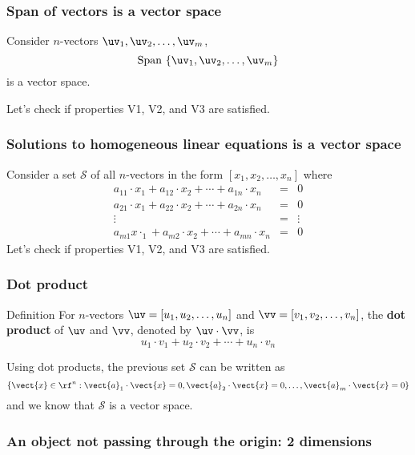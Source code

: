 \begin{frame}
  \frametitle{Span of vectors is a vector space}
  Consider $n$-vectors $\uv_1,\uv_2,\ldots,\uv_m$,
  \[
  \mathrm{Span}\ \{\uv_1,\uv_2,\ldots,\uv_m\}
  \]
  is a vector space.

  \pause
  \vspace{0.2in}
  Let's check if properties V1, V2, and V3 are satisfied.
  \vspace{1.5in}
\end{frame}

\begin{frame}
  \frametitle{Solutions to homogeneous linear equations is a vector space}
  Consider a set ${\mathcal S}$ of all $n$-vectors in the form $[x_1,x_2,\ldots,x_n]$ where
  \[
  \begin{array}{rcl}
    a_{11}\cdot x_1 + a_{12}\cdot x_2 + \cdots + a_{1n}\cdot x_n &=& 0 \\
    a_{21}\cdot x_1 + a_{22}\cdot x_2 + \cdots + a_{2n}\cdot x_n &=& 0 \\
    \vdots &=& \vdots \\
    a_{m1}x\cdot _1 + a_{m2}\cdot x_2 + \cdots + a_{mn}\cdot x_n &=& 0
  \end{array}
  \]
  \vspace{0.2in}
  Let's check if properties V1, V2, and V3 are satisfied.
  \vspace{1.5in}
  
\end{frame}

\begin{frame}
  \frametitle{Dot product}

  \begin{block}{Definition}
    For $n$-vectors $\uv=[u_1,u_2,\ldots,u_n]$ and $\vv=[v_1,v_2,\ldots,v_n]$, the {\bf dot product} of $\uv$ and $\vv$, denoted by $\uv\cdot\vv$, is
    \[
    u_1\cdot v_1 + 
    u_2\cdot v_2 +
    \cdots +
    u_n\cdot v_n 
    \]
  \end{block}

  \vspace{0.2in}
  \pause
  Using dot products, the previous set $\mathcal S$ can be written as
  \[
  \{ \vect{x}\in \rf^n :
  \vect{a}_1\cdot \vect{x} = 0,
  \vect{a}_2\cdot \vect{x} = 0,\ldots,
  \vect{a}_m\cdot \vect{x} = 0
  \}
  \]
  and we know that $\mathcal S$ is a vector space.
\end{frame}

\begin{frame}
  \frametitle{An object not passing through the origin: 2 dimensions}
\end{frame}

